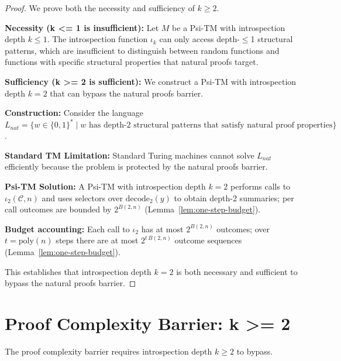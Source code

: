 \begin{proof}
We prove both the necessity and sufficiency of $k \geq 2$.

\textbf{Necessity (k <= 1 is insufficient):}
Let $M$ be a Psi-TM with introspection depth $k \leq 1$. The introspection function $\iota_k$ can only access depth-$\leq$1 structural patterns, which are insufficient to distinguish between random functions and functions with specific structural properties that natural proofs target.

\textbf{Sufficiency (k >= 2 is sufficient):}
We construct a Psi-TM with introspection depth $k = 2$ that can bypass the natural proofs barrier.

\textbf{Construction:}
Consider the language $L_{nat} = \{w \in \{0,1\}^* \mid w \text{ has depth-2 structural patterns that satisfy natural proof properties}\}$.

\textbf{Standard TM Limitation:}
Standard Turing machines cannot solve $L_{nat}$ efficiently because the problem is protected by the natural proofs barrier.

\textbf{Psi-TM Solution:}
A Psi-TM with introspection depth $k = 2$ performs calls to $\iota_2(\mathcal{C},n)$ and uses selectors over $\mathrm{decode}_2(y)$ to obtain depth-2 summaries; per call outcomes are bounded by $2^{B(2,n)}$ (Lemma~\ref{lem:one-step-budget}).

\textbf{Budget accounting:}
Each call to $\iota_2$ has at most $2^{B(2,n)}$ outcomes; over $t=\mathrm{poly}(n)$ steps there are at most $2^{t\,B(2,n)}$ outcome sequences (Lemma~\ref{lem:one-step-budget}).

This establishes that introspection depth $k = 2$ is both necessary and sufficient to bypass the natural proofs barrier.
\end{proof}

\section{Proof Complexity Barrier: k >= 2}

\begin{theorem}
The proof complexity barrier requires introspection depth $k \geq 2$ to bypass.
\end{theorem}

